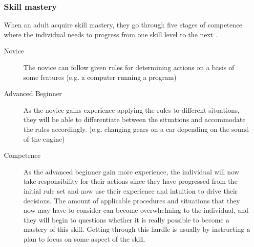 \subsubsection{Skill mastery}
When an adult acquire skill mastery, they go through five stages of competence where the individual needs to progress from one skill level to the next \cite{Dreyfus2004}.

\begin{description}
  \item[Novice] The novice can follow given rules for determining actions on a basis of some features (e.g. a computer running a program)
  \item[Advanced Beginner] As the novice gains experience applying the rules to different situations, they will be able to differentiate between the situations and accommodate the rules accordingly. (e.g. changing gears on a car depending on the sound of the engine)
  \item[Competence] As the advanced beginner gain more experience, the individual will now take responsibility for their actions since they have progressed from the initial rule set and now use their experience and intuition to drive their decisions. The amount of applicable procedures and situations that they now may have to consider can become overwhelming to the individual, and they will begin to questions whether it is really possible to become a mastery of this skill. Getting through this hurdle is usually by instructing a plan to focus on some aspect of the skill.
  \ignore{\item[Proficiency]}
  \ignore{\item[Expertise]}
\end{description}

